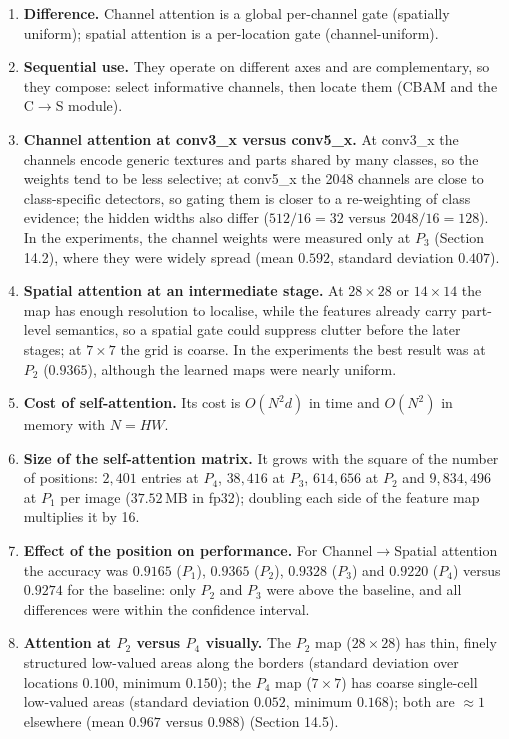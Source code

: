 \documentclass[10pt]{article}
\begin{document}
\begin{enumerate}
\item \textbf{Difference.} Channel attention is a global per-channel gate (spatially uniform); spatial attention is a per-location gate (channel-uniform).

\item \textbf{Sequential use.} They operate on different axes and are complementary, so they compose: select informative channels, then locate them (CBAM and the C$\rightarrow$S module).

\item \textbf{Channel attention at conv3\_x versus conv5\_x.} At conv3\_x the channels encode generic textures and parts shared by many classes, so the weights tend to be less selective; at conv5\_x the 2048 channels are close to class-specific detectors, so gating them is closer to a re-weighting of class evidence; the hidden widths also differ ($512/16=32$ versus $2048/16=128$). In the experiments, the channel weights were measured only at $P_3$ (Section 14.2), where they were widely spread (mean $0.592$, standard deviation $0.407$).

\item \textbf{Spatial attention at an intermediate stage.} At $28\times28$ or $14\times14$ the map has enough resolution to localise, while the features already carry part-level semantics, so a spatial gate could suppress clutter before the later stages; at $7\times7$ the grid is coarse. In the experiments the best result was at $P_2$ ($0.9365$), although the learned maps were nearly uniform.

\item \textbf{Cost of self-attention.} Its cost is $O(N^2d)$ in time and $O(N^2)$ in memory with $N=HW$.

\item \textbf{Size of the self-attention matrix.} It grows with the square of the number of positions: $2{,}401$ entries at $P_4$, $38{,}416$ at $P_3$, $614{,}656$ at $P_2$ and $9{,}834{,}496$ at $P_1$ per image ($37.52$\,MB in fp32); doubling each side of the feature map multiplies it by 16.

\item \textbf{Effect of the position on performance.} For Channel$\rightarrow$Spatial attention the accuracy was $0.9165$ ($P_1$), $0.9365$ ($P_2$), $0.9328$ ($P_3$) and $0.9220$ ($P_4$) versus $0.9274$ for the baseline: only $P_2$ and $P_3$ were above the baseline, and all differences were within the confidence interval.

\item \textbf{Attention at $P_2$ versus $P_4$ visually.} The $P_2$ map ($28\times28$) has thin, finely structured low-valued areas along the borders (standard deviation over locations $0.100$, minimum $0.150$); the $P_4$ map ($7\times7$) has coarse single-cell low-valued areas (standard deviation $0.052$, minimum $0.168$); both are $\approx1$ elsewhere (mean $0.967$ versus $0.988$) (Section 14.5).


\end{enumerate}
\end{document}
